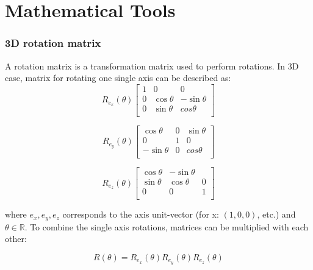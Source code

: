 

\chapter{Mathematical Tools}

\subsection{3D rotation matrix}
\label{app:3DrotationMatrix}
A rotation matrix is a transformation matrix used to perform rotations.
In 3D case, matrix for rotating one single axis can be described as:
\begin{equation}
    R_{e_x} (\theta)
    \begin{bmatrix}
        1 & 0 & 0\\
        0 & \cos \theta & - \sin \theta \\
        0 & \sin \theta & cos \theta \\
    \end{bmatrix}
\end{equation}

\begin{equation}
    R_{e_y} (\theta)
    \begin{bmatrix}
        \cos \theta & 0 & \sin \theta\\
        0 & 1 & 0 \\
        - \sin \theta & 0 & cos \theta \\
    \end{bmatrix}
\end{equation}

\begin{equation}
    R_{e_z} (\theta)
    \begin{bmatrix}
        \cos \theta & - \sin \theta\\
        \sin \theta & \cos \theta & 0 \\
        0 & 0 & 1 \\
    \end{bmatrix}
\end{equation}

where $e_x, e_y, e_z$ corresponds to the axis unit-vector (for x: $(1,0,0)$, etc.) and $\theta \in \mathbb{R}$.
To combine the single axis rotations, matrices can be multiplied with each other:

\begin{equation}
    \label{eq:3d-rotation}
    R (\theta) = R_{e_x} (\theta) R_{e_y} (\theta) R_{e_z} (\theta)
\end{equation}

